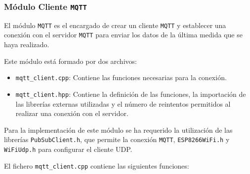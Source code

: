 \subsubsection{Módulo Cliente \texttt{MQTT}}

El módulo \texttt{MQTT} es el encargado de crear un cliente \texttt{MQTT} y establecer una conexión con el servidor \texttt{MQTT} para enviar los datos de la última medida que se haya realizado. 

Este módulo está formado por dos archivos:
\begin{itemize}
    \item \texttt{mqtt\_client.cpp}: Contiene las funciones necesarias para la conexión.
    \item \texttt{mqtt\_client.hpp}: Contiene la definición de las funciones, la importación de las librerías externas utilizadas y el número de reintentos permitidos al realizar una conexión con el servidor.
\end{itemize}

Para la implementación de este módulo se ha requerido la utilización de las librerías \texttt{PubSubClient.h}, que permite la conexión \texttt{MQTT}, \texttt{ESP8266WiFi.h} y \texttt{WiFiUdp.h} para configurar el cliente UDP. \cite{olearyKnollearyPubsubclient2024}

El fichero \texttt{mqtt\_client.cpp} contiene las siguientes funciones:

